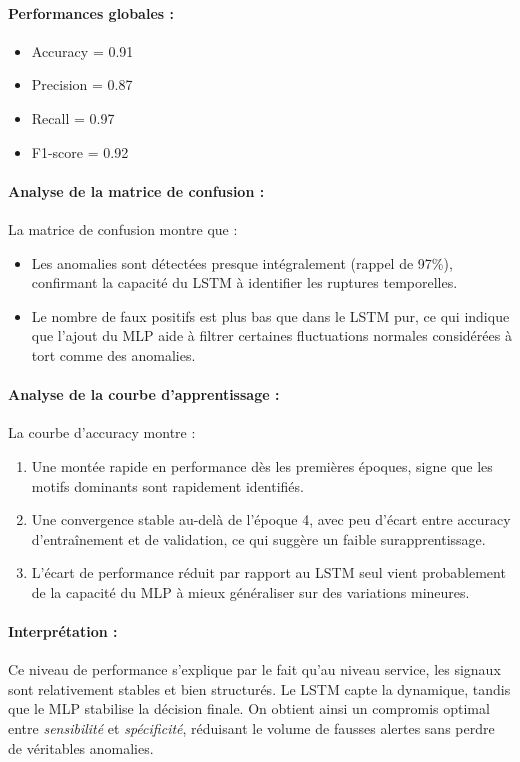 \documentclass[a4paper,12pt]{report}
\begin{document}
\paragraph{Performances globales :}
\begin{itemize}
    \item Accuracy = 0.91
    \item Precision = 0.87
    \item Recall = 0.97
    \item F1-score = 0.92
\end{itemize}

\paragraph{Analyse de la matrice de confusion :}
La matrice de confusion montre que :
\begin{itemize}
    \item Les anomalies sont détectées presque intégralement (rappel de 97\%), confirmant la capacité du LSTM à identifier les ruptures temporelles.
    \item Le nombre de faux positifs est plus bas que dans le LSTM pur, ce qui indique que l’ajout du MLP aide à filtrer certaines fluctuations normales considérées à tort comme des anomalies.
\end{itemize}

\paragraph{Analyse de la courbe d’apprentissage :}
La courbe d’accuracy montre :
\begin{enumerate}
    \item Une montée rapide en performance dès les premières époques, signe que les motifs dominants sont rapidement identifiés.
    \item Une convergence stable au-delà de l’époque 4, avec peu d’écart entre accuracy d’entraînement et de validation, ce qui suggère un faible surapprentissage.
    \item L’écart de performance réduit par rapport au LSTM seul vient probablement de la capacité du MLP à mieux généraliser sur des variations mineures.
\end{enumerate}

\paragraph{Interprétation :}
Ce niveau de performance s’explique par le fait qu’au niveau service, les signaux sont relativement stables et bien structurés. Le LSTM capte la dynamique, tandis que le MLP stabilise la décision finale. On obtient ainsi un compromis optimal entre \textit{sensibilité} et \textit{spécificité}, réduisant le volume de fausses alertes sans perdre de véritables anomalies.
\end{document}
